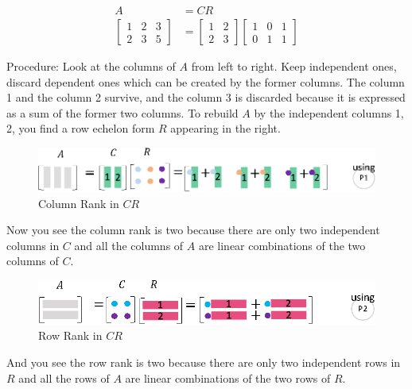 \documentclass[letterpaper]{article}
\begin{document}
\begin{equation*}
  \begin{split}
    A &= CR\\
  \begin{bmatrix}
    1 & 2 & 3 \\
    2 & 3 & 5
  \end{bmatrix}
  & =
  \begin{bmatrix}
    1 & 2 \\
    2 & 3
  \end{bmatrix}
  \begin{bmatrix}
    1 & 0 & 1 \\
    0 & 1 & 1
  \end{bmatrix}
\end{split}
\end{equation*}

Procedure: Look at the columns of $A$ from left to right. Keep independent ones,
discard dependent ones which can be created by the former columns.
The column 1 and the column 2 survive, and the column 3 is discarded
because it is expressed as a sum of the former two columns.
To rebuild $A$ by the independent columns 1, 2, you find a row echelon form $R$
appearing in the right.

\begin{figure}[H]
  \centering
  \includegraphics[scale=0.8]{CR1.eps}
  \caption{Column Rank in $CR$}
\end{figure}

Now you see the column rank is two because there are only two independent columns in $C$
and all the columns of $A$ are linear combinations of the two columns of $C$.

\begin{figure}[H]
  \centering
  \includegraphics[scale=0.8]{CR2.eps}
  \caption{Row Rank in $CR$}
\end{figure}

And you see the row rank is two because there are only two independent rows in $R$
and all the rows of $A$ are linear combinations of the two rows of $R$.
\end{document}
